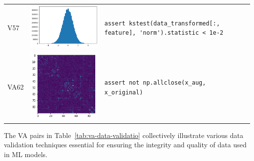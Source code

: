 \begin{longtable}{@{} m{} m{} m{} @{}}
  V57 &
  \includegraphics[width=\linewidth]{va57.png} &
  \lstinline[]$assert kstest(data_transformed[:, feature], 'norm').statistic < 1e-2$\\

  VA62 &
  \includegraphics[width=\linewidth]{va62.png} &
  \lstinline[]$assert not np.allclose(x_aug, x_original)$\\

\end{longtable}\label{tab:va-data-validatio}

The VA pairs in Table~\ref{tab:va-data-validatio} collectively illustrate various data validation techniques essential for ensuring the integrity and quality of data used in ML models. 

